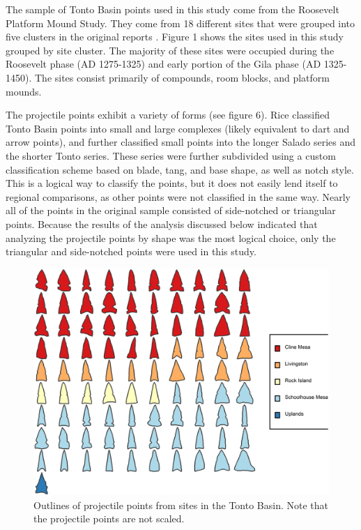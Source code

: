 \documentclass[letterpaper]{article}
\begin{document}
The sample of Tonto Basin points used in this study come from the Roosevelt Platform Mound Study. They come from 18 different sites that were grouped into five clusters in the original reports \autocite[see][ for an overview]{Rice1998-ku}. Figure 1 shows the sites used in this study grouped by site cluster. The majority of these sites were occupied during the Roosevelt phase (AD 1275-1325) and early portion of the Gila phase (AD 1325-1450). The sites consist primarily of compounds, room blocks, and platform mounds.

The projectile points exhibit a variety of forms (see figure 6). Rice \autocite*{Rice1994-rk} classified Tonto Basin points into small and large complexes (likely equivalent to dart and arrow points), and further classified small points into the longer Salado series and the shorter Tonto series. These series were further subdivided using a custom classification scheme based on blade, tang, and base shape, as well as notch style. This is a logical way to classify the points, but it does not easily lend itself to regional comparisons, as other points were not classified in the same way. Nearly all of the points in the original sample consisted of side-notched or triangular points. Because the results of the analysis discussed below indicated that analyzing the projectile points by shape was the most logical choice, only the triangular and side-notched points were used in this study.

\begin{figure}
\includegraphics[width=1\linewidth]{figures/TontoPointsFinal} \caption{Outlines of projectile points from sites in the Tonto Basin. Note that the projectile points are not scaled.}\label{fig:TontoPointsFinal}
\end{figure}
\end{document}
